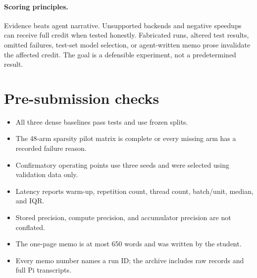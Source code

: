 \documentclass[11pt,letterpaper]{article}
\begin{document}
\paragraph{Scoring principles.} Evidence beats agent narrative. Unsupported backends and negative speedups can receive full credit when tested honestly. Fabricated runs, altered test results, omitted failures, test-set model selection, or agent-written memo prose invalidate the affected credit. The goal is a defensible experiment, not a predetermined result.

\section*{Pre-submission checks}
\begin{itemize}[label=$\square$]
 \item All three dense baselines pass tests and use frozen splits.
 \item The 48-arm sparsity pilot matrix is complete or every missing arm has a recorded failure reason.
 \item Confirmatory operating points use three seeds and were selected using validation data only.
 \item Latency reports warm-up, repetition count, thread count, batch/unit, median, and IQR.
 \item Stored precision, compute precision, and accumulator precision are not conflated.
 \item The one-page memo is at most 650 words and was written by the student.
 \item Every memo number names a run ID; the archive includes raw records and full Pi transcripts.
\end{itemize}
\end{document}
